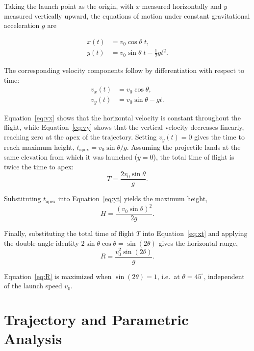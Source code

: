 \documentclass[11pt]{article}
\begin{document}
Taking the launch point as the origin, with $x$ measured horizontally and $y$ measured vertically upward,
the equations of motion under constant gravitational acceleration $g$ are

\begin{align}
  x(t) &= v_0 \cos\theta \; t, \label{eq:xt} \\
  y(t) &= v_0 \sin\theta \; t - \tfrac{1}{2} g t^2. \label{eq:yt}
\end{align}

The corresponding velocity components follow by differentiation with respect to time:
\begin{align}
  v_x(t) &= v_0 \cos\theta, \label{eq:vx} \\
  v_y(t) &= v_0 \sin\theta - g t. \label{eq:vy}
\end{align}

Equation~\eqref{eq:vx} shows that the horizontal velocity is constant throughout the flight, while
Equation~\eqref{eq:vy} shows that the vertical velocity decreases linearly, reaching zero at the apex of the
trajectory. Setting $v_y(t) = 0$ gives the time to reach maximum height, $t_{\mathrm{apex}} = v_0 \sin\theta
/ g$. Assuming the projectile lands at the same elevation from which it was launched ($y = 0$), the total
time of flight is twice the time to apex:
\begin{equation}
  T = \frac{2 v_0 \sin\theta}{g}. \label{eq:T}
\end{equation}

Substituting $t_{\mathrm{apex}}$ into Equation~\eqref{eq:yt} yields the maximum height,
\begin{equation}
  H = \frac{\left(v_0 \sin\theta\right)^2}{2g}. \label{eq:H}
\end{equation}

Finally, substituting the total time of flight $T$ into Equation~\eqref{eq:xt} and applying the double-angle
identity $2\sin\theta\cos\theta = \sin(2\theta)$ gives the horizontal range,
\begin{equation}
  R = \frac{v_0^2 \sin(2\theta)}{g}. \label{eq:R}
\end{equation}

Equation~\eqref{eq:R} is maximized when $\sin(2\theta) = 1$, i.e.\ at $\theta = 45^\circ$, independent of the
launch speed $v_0$.

\section{Trajectory and Parametric Analysis}
\label{sec:analysis}
\end{document}
